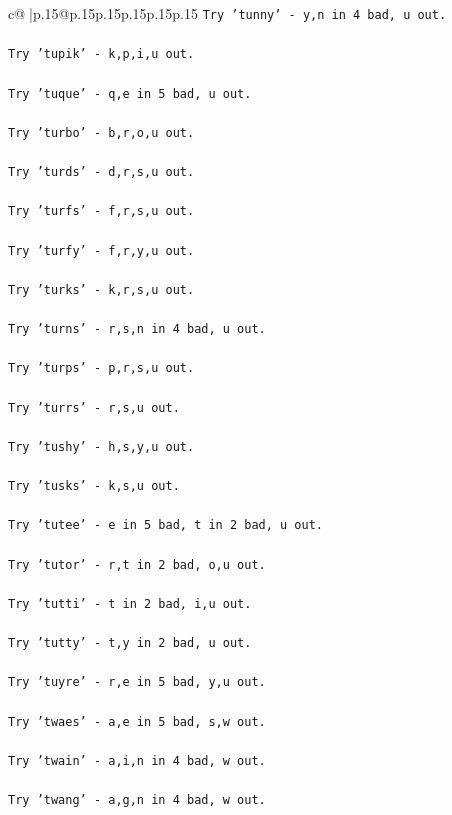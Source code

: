 \documentclass{article}
\begin{document}
{\begin{supertabular}{c@{$\;$}|p{.15\linewidth}@{}p{.15\linewidth}p{.15\linewidth}p{.15\linewidth}p{.15\linewidth}p{.15\linewidth}}
{{{\texttt{Try 'tunny' {-} y,n in 4 bad, u out.} \\
\\ 
\texttt{Try 'tupik' {-} k,p,i,u out.} \\
\\ 
\texttt{Try 'tuque' {-} q,e in 5 bad, u out.} \\
\\ 
\texttt{Try 'turbo' {-} b,r,o,u out.} \\
\\ 
\texttt{Try 'turds' {-} d,r,s,u out.} \\
\\ 
\texttt{Try 'turfs' {-} f,r,s,u out.} \\
\\ 
\texttt{Try 'turfy' {-} f,r,y,u out.} \\
\\ 
\texttt{Try 'turks' {-} k,r,s,u out.} \\
\\ 
\texttt{Try 'turns' {-} r,s,n in 4 bad, u out.} \\
\\ 
\texttt{Try 'turps' {-} p,r,s,u out.} \\
\\ 
\texttt{Try 'turrs' {-} r,s,u out.} \\
\\ 
\texttt{Try 'tushy' {-} h,s,y,u out.} \\
\\ 
\texttt{Try 'tusks' {-} k,s,u out.} \\
\\ 
\texttt{Try 'tutee' {-} e in 5 bad, t in 2 bad, u out.} \\
\\ 
\texttt{Try 'tutor' {-} r,t in 2 bad, o,u out.} \\
\\ 
\texttt{Try 'tutti' {-} t in 2 bad, i,u out.} \\
\\ 
\texttt{Try 'tutty' {-} t,y in 2 bad, u out.} \\
\\ 
\texttt{Try 'tuyre' {-} r,e in 5 bad, y,u out.} \\
\\ 
\texttt{Try 'twaes' {-} a,e in 5 bad, s,w out.} \\
\\ 
\texttt{Try 'twain' {-} a,i,n in 4 bad, w out.} \\
\\ 
\texttt{Try 'twang' {-} a,g,n in 4 bad, w out.} \\
}}}
\end{supertabular}}
\end{document}
